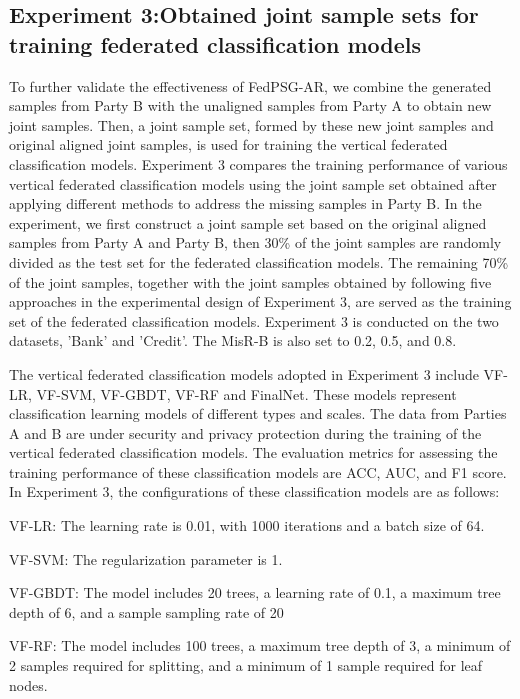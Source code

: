 \documentclass[final,1p,times]{elsarticle}
\begin{document}
\subsection{Experiment 3:Obtained joint sample sets for training federated classification models}
\label{subsec44}

To further validate the effectiveness of FedPSG-AR, we combine the generated samples from Party B with the unaligned samples from Party A to obtain new joint samples. Then, a joint sample set, formed by these new joint samples and original aligned joint samples, is used for training the vertical federated classification models. Experiment 3 compares the training performance of various vertical federated classification models using the joint sample set obtained after applying different methods to address the missing samples in Party B. In the experiment, we first construct a joint sample set based on the original aligned samples from Party A and Party B, then 30\% of the joint samples are randomly divided as the test set for the federated classification models. The remaining 70\% of the joint samples, together with the joint samples obtained by following five approaches in the experimental design of Experiment 3, are served as the training set of the federated classification models. Experiment 3 is conducted on the two datasets, 'Bank' and 'Credit'. The MisR-B is also set to 0.2, 0.5, and 0.8. 

The vertical federated classification models adopted in Experiment 3 include VF-LR\cite{39}, VF-SVM\cite{40}, VF-GBDT\cite{41}, VF-RF\cite{42} and FinalNet\cite{43}. These models represent classification learning models of different types and scales. The data from Parties A and B are under security and privacy protection during the training of the vertical federated classification models. The evaluation metrics\cite{44} for assessing the training performance of these classification models are ACC, AUC, and F1 score. In Experiment 3, the configurations of these classification models are as follows:

VF-LR: The learning rate is 0.01, with 1000 iterations and a batch size of 64.

VF-SVM: The regularization parameter is 1.

VF-GBDT: The model includes 20 trees, a learning rate of 0.1, a maximum tree depth of 6, and a sample sampling rate of 20%

VF-RF: The model includes 100 trees, a maximum tree depth of 3, a minimum of 2 samples required for splitting, and a minimum of 1 sample required for leaf nodes.
\end{document}
